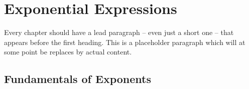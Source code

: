 \chapter{Exponential Expressions}
\label{ch:expoexpr}



Every chapter should have a lead paragraph -- even just a short one -- that appears before the first heading. This is a placeholder paragraph which will at some point be replaces by actual content.

\section{Fundamentals of Exponents}
\label{sec:exposimpform}


